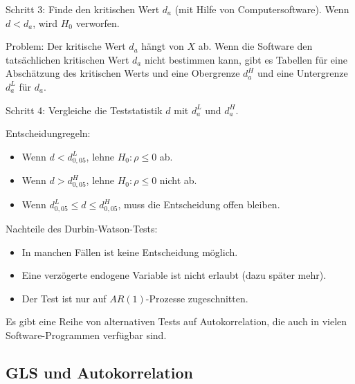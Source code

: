 \documentclass{article}
\begin{document}
Schritt 3: Finde den kritischen Wert $d_{a}$ (mit Hilfe von Computersoftware).
Wenn $d<d_{a}$, wird $H_{0}$ verworfen.

Problem: Der kritische Wert $d_{a}$ hängt von $X$ ab. Wenn die Software den
tatsächlichen kritischen Wert $d_{a}$ nicht bestimmen kann, gibt es Tabellen
für eine Abschätzung des kritischen Werts und eine Obergrenze $d_{a}^{H}$ 
und eine Untergrenze $d_{a}^{L}$ für $d_{a}$.

Schritt 4: Vergleiche die Teststatistik $d$ mit $d_{a}^{L}$ und $d_{a}^{H}$.

Entscheidungregeln:
\begin{itemize}
	\item Wenn $d<d_{0,05}^{L}$, lehne $H_{0}:\rho \leq 0$ ab.
	\item Wenn $d>d_{0,05}^{H}$, lehne $H_{0}:\rho \leq 0$ nicht ab.
	\item Wenn $d_{0,05}^{L}\leq d\leq d_{0,05}^{H}$, muss die Entscheidung offen bleiben.
\end{itemize}

Nachteile des Durbin-Watson-Tests:
\begin{itemize}
	\item In manchen Fällen ist keine Entscheidung möglich.
	\item Eine verzögerte endogene Variable ist nicht erlaubt (dazu später mehr).
	\item Der Test ist nur auf $AR(1)$-Prozesse zugeschnitten.
\end{itemize}
Es gibt eine Reihe von alternativen Tests auf Autokorrelation, die auch
in vielen Software-Programmen verfügbar sind.

\subsection*{GLS und Autokorrelation}
\end{document}
